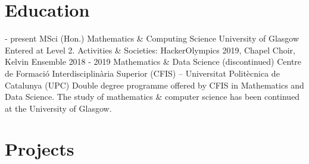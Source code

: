 \documentclass[]{twentysecondcv}
\begin{document}
\makeprofile






\begin{adjustwidth}{10pt}{10pt}

\section*{Education}

\renewcommand{\twentylen}{11cm}
\begin{twenty}[1.5cm]
  \twentyitem
    { - present}
    {\large MSci (Hon.) Mathematics \& Computing Science}
    {University of Glasgow}
    {Entered at Level 2. Activities \& Societies: HackerOlympics 2019, Chapel Choir, Kelvin Ensemble}
  \twentyitem
    {2018 - 2019}
    {Mathematics \& Data Science (discontinued)}
    {Centre de Formació Interdisciplinària Superior (CFIS) – Universitat Politècnica de Catalunya (UPC)}
    {Double degree programme offered by CFIS in Mathematics and Data Science. The study of mathematics \& computer science has been continued at the University of Glasgow.}
\end{twenty}


\section*{Projects}


\end{adjustwidth}
\end{document}
